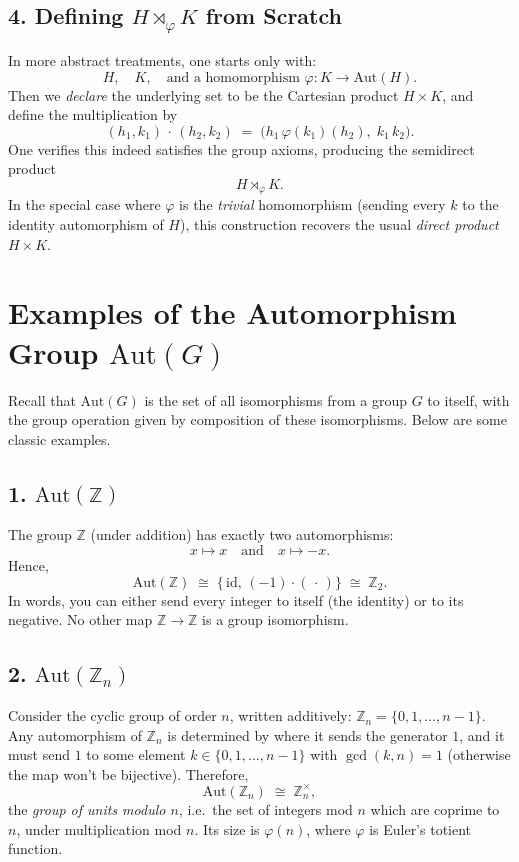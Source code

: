 \documentclass[12pt]{article}
\theoremstyle{definition} %
\theoremstyle{plain} %
\begin{document}
\subsection*{4. Defining \boldmath$H \rtimes_\varphi K$ from Scratch}

In more abstract treatments, one starts only with:
\[
  H, \quad K, \quad \text{and a homomorphism } 
  \varphi : K \to \mathrm{Aut}(H).
\]
Then we \emph{declare} the underlying set to be the Cartesian product $H \times K$, and define 
the multiplication by
\[
  (h_1,k_1) \,\cdot\, (h_2,k_2)
  \;=\;
  \bigl(h_1\,\varphi(k_1)(h_2),\; k_1\,k_2\bigr).
\]
One verifies this indeed satisfies the group axioms, producing the semidirect product 
\[
  H \rtimes_{\varphi} K.
\]
In the special case where $\varphi$ is the \emph{trivial} homomorphism (sending every $k$ to the 
identity automorphism of $H$), this construction recovers the usual \emph{direct product} $H \times K$.
\section*{Examples of the Automorphism Group \texorpdfstring{$\mathrm{Aut}(G)$}{Aut(G)}}

Recall that $\mathrm{Aut}(G)$ is the set of all isomorphisms from a group $G$ to itself, 
with the group operation given by composition of these isomorphisms. 
Below are some classic examples.

\subsection*{1. \texorpdfstring{$\mathrm{Aut}(\mathbb{Z})$}{Aut(Z)}}

The group $\mathbb{Z}$ (under addition) has exactly two automorphisms:
\[
  x \mapsto x 
  \quad\text{and}\quad
  x \mapsto -x.
\]
Hence,
\[
  \mathrm{Aut}(\mathbb{Z}) \;\cong\; \{\,\mathrm{id},\,(-1)\cdot(\,\cdot\,)\}
  \;\cong\; \mathbb{Z}_2.
\]
In words, you can either send every integer to itself (the identity) or to its negative. 
No other map $\mathbb{Z} \to \mathbb{Z}$ is a group isomorphism.

\subsection*{2. \texorpdfstring{$\mathrm{Aut}(\mathbb{Z}_n)$}{Aut(Z\_n)}}

Consider the cyclic group of order $n$, written additively: $\mathbb{Z}_n = \{0,1,\dots,n-1\}$. 
Any automorphism of $\mathbb{Z}_n$ is determined by where it sends the generator $1$, 
and it must send $1$ to some element $k \in \{0,1,\dots,n-1\}$ with $\gcd(k,n) = 1$ 
(otherwise the map won't be bijective). Therefore,
\[
  \mathrm{Aut}(\mathbb{Z}_n) \;\cong\; \mathbb{Z}_n^{\times},
\]
the \emph{group of units modulo $n$}, i.e.\ the set of integers mod $n$ which are coprime to $n$, 
under multiplication mod $n$. Its size is $\varphi(n)$, where $\varphi$ is Euler's totient function.
\end{document}
